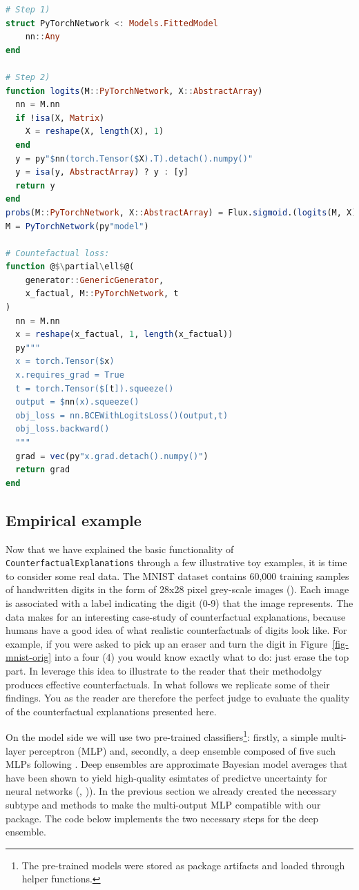 \documentclass[
  letterpaper,
  DIV=11,
  numbers=noendperiod]{scrartcl}
\begin{document}
\begin{lstlisting}[language=Julia, escapechar=@]
# Step 1)
struct PyTorchNetwork <: Models.FittedModel
    nn::Any
end

# Step 2)
function logits(M::PyTorchNetwork, X::AbstractArray)
  nn = M.nn
  if !isa(X, Matrix)
    X = reshape(X, length(X), 1)
  end
  y = py"$nn(torch.Tensor($X).T).detach().numpy()"
  y = isa(y, AbstractArray) ? y : [y]
  return y
end
probs(M::PyTorchNetwork, X::AbstractArray) = Flux.sigmoid.(logits(M, X))
M = PyTorchNetwork(py"model")

# Countefactual loss:
function @$\partial\ell$@(
    generator::GenericGenerator, 
    x_factual, M::PyTorchNetwork, t
) 
  nn = M.nn
  x = reshape(x_factual, 1, length(x_factual))
  py"""
  x = torch.Tensor($x)
  x.requires_grad = True
  t = torch.Tensor($[t]).squeeze()
  output = $nn(x).squeeze()
  obj_loss = nn.BCEWithLogitsLoss()(output,t)
  obj_loss.backward()
  """
  grad = vec(py"x.grad.detach().numpy()")
  return grad
end
\end{lstlisting}

\hypertarget{sec-emp}{%
\subsection{Empirical example}\label{sec-emp}}

Now that we have explained the basic functionality of
\texttt{CounterfactualExplanations} through a few illustrative toy
examples, it is time to consider some real data. The MNIST dataset
contains 60,000 training samples of handwritten digits in the form of
28x28 pixel grey-scale images (\cite{lecun1998mnist}). Each image is
associated with a label indicating the digit (0-9) that the image
represents. The data makes for an interesting case-study of
counterfactual explanations, because humans have a good idea of what
realistic counterfactuals of digits look like. For example, if you were
asked to pick up an eraser and turn the digit in
Figure~\ref{fig-mnist-orig} into a four (4) you would know exactly what
to do: just erase the top part. In \cite{schut2021generating} leverage
this idea to illustrate to the reader that their methodolgy produces
effective counterfactuals. In what follows we replicate some of their
findings. You as the reader are therefore the perfect judge to evaluate
the quality of the counterfactual explanations presented here.

On the model side we will use two pre-trained classifiers\footnote{The
  pre-trained models were stored as package artifacts and loaded through
  helper functions.}: firstly, a simple multi-layer perceptron (MLP)
and, secondly, a deep ensemble composed of five such MLPs following
\cite{schut2021generating}. Deep ensembles are approximate Bayesian
model averages that have been shown to yield high-quality esimtates of
predictve uncertainty for neural networks (\cite{wilson2019case.pdf},
\cite{lakshminarayanan2016simple})). In the previous section we already
created the necessary subtype and methods to make the multi-output MLP
compatible with our package. The code below implements the two necessary
steps for the deep ensemble.
\end{document}
